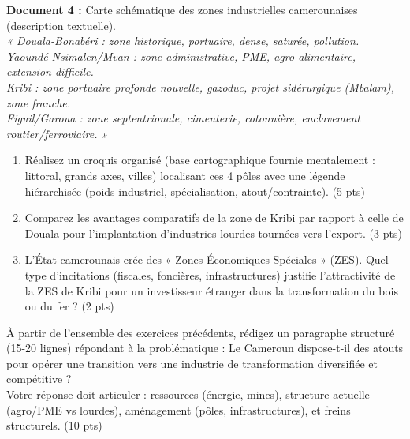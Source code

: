 \documentclass[11pt]{article}
\begin{document}
\begin{exercice}
\textbf{Document 4 :} Carte schématique des zones industrielles camerounaises (description textuelle).\\
\textit{« Douala-Bonabéri : zone historique, portuaire, dense, saturée, pollution.\\
Yaoundé-Nsimalen/Mvan : zone administrative, PME, agro-alimentaire, extension difficile.\\
Kribi : zone portuaire profonde nouvelle, gazoduc, projet sidérurgique (Mbalam), zone franche.\\
Figuil/Garoua : zone septentrionale, cimenterie, cotonnière, enclavement routier/ferroviaire. »}
\begin{enumerate}
\item Réalisez un croquis organisé (base cartographique fournie mentalement : littoral, grands axes, villes) localisant ces 4 pôles avec une légende hiérarchisée (poids industriel, spécialisation, atout/contrainte). \hfill (5 pts)
\item Comparez les avantages comparatifs de la zone de Kribi par rapport à celle de Douala pour l'implantation d'industries lourdes tournées vers l'export. \hfill (3 pts)
\item L'État camerounais crée des « Zones Économiques Spéciales » (ZES). Quel type d'incitations (fiscales, foncières, infrastructures) justifie l'attractivité de la ZES de Kribi pour un investisseur étranger dans la transformation du bois ou du fer ? \hfill (2 pts)
\end{enumerate}
\end{exercice}

\begin{exercice}
À partir de l'ensemble des exercices précédents, rédigez un paragraphe structuré (15-20 lignes) répondant à la problématique : \og Le Cameroun dispose-t-il des atouts pour opérer une transition vers une industrie de transformation diversifiée et compétitive ? \fg\\
Votre réponse doit articuler : ressources (énergie, mines), structure actuelle (agro/PME vs lourdes), aménagement (pôles, infrastructures), et freins structurels. \hfill (10 pts)
\end{exercice}
\end{document}
